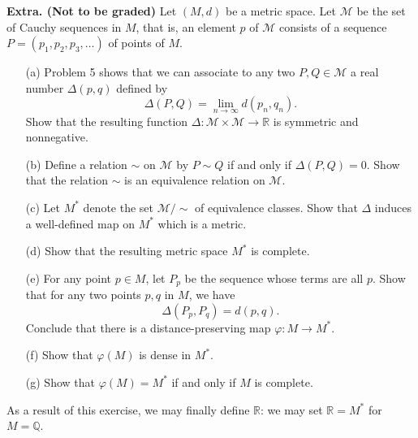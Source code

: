 \documentclass[12pt]{article}
\begin{document}
\noindent \textbf{Extra. (Not to be graded)} Let $(M,d)$ be a metric space. Let $\mathcal{M}$ be the set of Cauchy sequences in $M$, that is, an element $p$ of $\mathcal{M}$ consists of a sequence $P = (p_1, p_2, p_3, \ldots)$ of points of $M$. 
\begin{enumerate}
\item[(a)] Problem 5 shows that we can associate to any two $P,Q \in \mathcal{M}$ a real number $\Delta(p,q)$ defined by 
\[
\Delta(P,Q) = \lim_{n \to \infty}d(p_n,q_n).
\]
Show that the resulting function $\Delta : \mathcal{M} \times \mathcal{M} \to \mathbb{R}$ is symmetric and nonnegative. 
\item[(b)] Define a relation $\sim$ on $\mathcal{M}$ by $P \sim Q$ if and only if $\Delta(P,Q) = 0$. Show that the relation $\sim$ is an equivalence relation on $\mathcal{M}$. 
\item[(c)] Let $M^*$ denote the set $\mathcal{M}/\sim$ of equivalence classes. Show that $\Delta$ induces a well-defined map on $M^*$ which is a metric. 
\item[(d)] Show that the resulting metric space $M^*$ is complete. 
\item[(e)] For any point $p \in M$, let $P_p$ be the sequence whose terms are all $p$. Show that for any two points $p,q$ in $M$, we have 
\[
\Delta(P_p, P_q) = d(p,q).
\]
Conclude that there is a distance-preserving map $\varphi : M \to M^*$. 
\item[(f)] Show that $\varphi(M)$ is dense in $M^*$. 
\item[(g)] Show that $\varphi(M) = M^*$ if and only if $M$ is complete. 
\end{enumerate}
As a result of this exercise, we may finally define $\mathbb{R}$: we may set $\mathbb{R} = M^*$ for $M = \mathbb{Q}$. 
\end{document}
